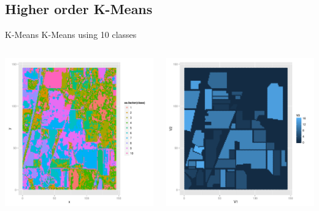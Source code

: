 \documentclass[11pt]{beamer}
\begin{document}
\subsection{Higher order K-Means}
\begin{frame}{K-Means}
K-Means using 10 classes
\begin{columns}[T]
\begin{column}{.48\textwidth}
\includegraphics[scale=.3]{km10.png}
\end{column}
\hfill
\begin{column}{.48\textwidth}
\includegraphics[scale=.3]{gt.png}
\end{column}
\end{columns}
\end{frame}
\end{document}
